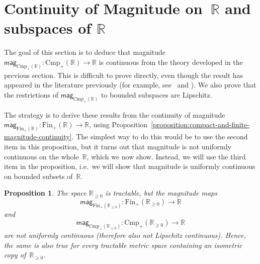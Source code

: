 \documentclass[11pt]{article}
\theoremstyle{plain}
\newtheorem{proposition}[theorem]{Proposition}
\theoremstyle{definition}
\newcommand{\RR}{\mathbb{R}}
\newcommand{\mg}[1][]{\mathsf{mag}_{#1}}
\newcommand{\fsub}{\mathrm{Fin}}
\newcommand{\ifsub}{\fsub_{+}}
\newcommand{\csub}{\mathrm{Cmp}}
\newcommand{\icsub}{\csub_{+}}
\begin{document}
\section{Continuity of Magnitude on~\texorpdfstring{$\RR$}{R} and subspaces of \texorpdfstring{$\RR$}{R}}\label{section:continuity_of_magnitude}


The goal of this section is to deduce that magnitude $\mg[\icsub(\RR)]\colon \icsub(\RR) \to \RR$ is continuous from the theory developed in the previous section. This is difficult to prove directly, even though the result has appeared in the literature previously (for example, see~\cite[Corollary 5.3.13]{LM17} and \cite[Corollary 2.12]{meckes2013}). We also prove that the restrictions of $\mg[\icsub(\RR)]$ to bounded subspaces are Lipschitz.

The strategy is to derive these results from the continuity of magnitude $\mg[\ifsub(\RR)]\colon \ifsub(\RR) \to \RR$, using Proposition~\ref{proposition:compact-and-finite-magnitude-continuity}. The simplest way to do this would be to use the second item in this proposition, but it turns out that magnitude is not uniformly continuous on the whole~$\RR$, which we now show. Instead, we will use the third item in the proposition, i.e.\ we will show that magnitude is uniformly continuous on bounded subsets of~$\RR$.

\begin{proposition}\label{proposition:magnitude-not-uniformly-continuous}
The space $\RR_{\geq 0}$ is tractable, but the magnitude maps 
\[
\mg[\ifsub(\RR_{\geq 0})]\colon \ifsub(\RR_{\geq 0}) \to \RR
\]
and 
\[\mg[\icsub(\RR_{\geq 0})]\colon \icsub(\RR_{\geq 0}) \to \RR
\]
are not uniformly continuous (therefore also not Lipschitz continuous). Hence, the same is also true for every tractable metric space containing an isometric copy of~$\RR_{\geq 0}$.
\end{proposition}
\end{document}
